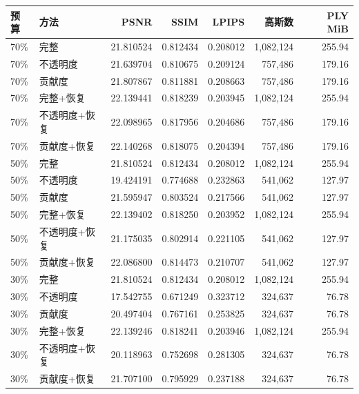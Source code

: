 \begin{center}
\small
\begin{tabular}{llrrrrr}
\toprule
预算 & 方法 & PSNR & SSIM & LPIPS & 高斯数 & PLY MiB \\
\midrule
70\% & 完整 & 21.810524 & 0.812434 & 0.208012 & 1,082,124 & 255.94 \\
70\% & 不透明度 & 21.639704 & 0.810675 & 0.209124 & 757,486 & 179.16 \\
70\% & 贡献度 & 21.807867 & 0.811881 & 0.208663 & 757,486 & 179.16 \\
70\% & 完整+恢复 & 22.139441 & 0.818239 & 0.203945 & 1,082,124 & 255.94 \\
70\% & 不透明度+恢复 & 22.098965 & 0.817956 & 0.204686 & 757,486 & 179.16 \\
70\% & 贡献度+恢复 & 22.140268 & 0.818075 & 0.204394 & 757,486 & 179.16 \\
50\% & 完整 & 21.810524 & 0.812434 & 0.208012 & 1,082,124 & 255.94 \\
50\% & 不透明度 & 19.424191 & 0.774688 & 0.232863 & 541,062 & 127.97 \\
50\% & 贡献度 & 21.595947 & 0.803524 & 0.217566 & 541,062 & 127.97 \\
50\% & 完整+恢复 & 22.139402 & 0.818250 & 0.203952 & 1,082,124 & 255.94 \\
50\% & 不透明度+恢复 & 21.175035 & 0.802914 & 0.221105 & 541,062 & 127.97 \\
50\% & 贡献度+恢复 & 22.086800 & 0.814473 & 0.210707 & 541,062 & 127.97 \\
30\% & 完整 & 21.810524 & 0.812434 & 0.208012 & 1,082,124 & 255.94 \\
30\% & 不透明度 & 17.542755 & 0.671249 & 0.323712 & 324,637 & 76.78 \\
30\% & 贡献度 & 20.497404 & 0.767161 & 0.253825 & 324,637 & 76.78 \\
30\% & 完整+恢复 & 22.139246 & 0.818241 & 0.203946 & 1,082,124 & 255.94 \\
30\% & 不透明度+恢复 & 20.118963 & 0.752698 & 0.281305 & 324,637 & 76.78 \\
30\% & 贡献度+恢复 & 21.707100 & 0.795929 & 0.237188 & 324,637 & 76.78 \\
\bottomrule
\end{tabular}
\end{center}
